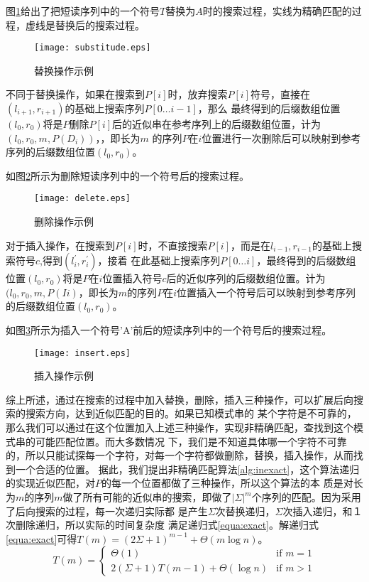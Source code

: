 图\ref{fig:substitude}给出了把短读序列中的一个符号$T$替换为$A$时的搜索过程，实线为精确匹配的过程，虚线是替换后的搜索过程。

\begin{figure}[htbp]
    \centering
    \texttt{[image: substitude.eps]}
    \caption{替换操作示例} \label{fig:substitude}
\end{figure}

不同于替换操作，如果在搜索到$P[i]$时，放弃搜索$P[i]$符号，直接在$(l_{i+1},r_{i+1})$的基础上搜索序列$P[0\ldots i-1]$，那么
最终得到的后缀数组位置$(l_0,r_0)$将是$P$删除$P[i]$后的近似串在参考序列上的后缀数组位置，计为$(l_0,r_0,m,P(D_i))$，，即长为$m$
的序列$P$在$i$位置进行一次删除后可以映射到参考序列的后缀数组位置$(l_0,r_0)$。

如图\ref{fig:delete}所示为删除短读序列中的一个符号后的搜索过程。

\begin{figure}[htbp]
    \centering
    \texttt{[image: delete.eps]}
    \caption{删除操作示例} \label{fig:delete}
\end{figure}

对于插入操作，在搜索到$P[i]$时，不直接搜索$P[i]$，而是在$l_{i-1},r_{i-1}$的基础上搜索符号$c$,得到$(l_{i}^{'},r_{i}^{'})$，接着
在此基础上搜索序列$P[0\ldots i]$，最终得到的后缀数组位置$(l_0,r_0)$将是$P$在$i$位置插入符号$c$后的近似序列的后缀数组位置。计为
$(l_0,r_0,m,P(Ii)$，即长为$m$的序列$P$在$i$位置插入一个符号后可以映射到参考序列的后缀数组位置$(l_0,r_0)$。

如图\ref{fig:insert}所示为插入一个符号'A'前后的短读序列中的一个符号后的搜索过程。

\begin{figure}[htbp]
    \centering
    \texttt{[image: insert.eps]}
    \caption{插入操作示例} \label{fig:insert}
\end{figure}

综上所述，通过在搜索的过程中加入替换，删除，插入三种操作，可以扩展后向搜索的搜索方向，达到近似匹配的目的。如果已知模式串的
某个字符是不可靠的，那么我们可以通过在这个位置加入上述三种操作，实现非精确匹配，查找到这个模式串的可能匹配位置。而大多数情况
下，我们是不知道具体哪一个字符不可靠的，所以只能试探每一个字符，对每一个字符都做删除，替换，插入操作，从而找到一个合适的位置。
据此，我们提出非精确匹配算法\ref{alg:inexact}，这个算法递归的实现近似匹配，对$P$的每一个位置都做了三种操作，所以这个算法的本
质是对长为$m$的序列$m$做了所有可能的近似串的搜索，即做了$|\Sigma|^m$个序列的匹配。因为采用了后向搜索的过程，每一次递归实际都
是产生$\Sigma$次替换递归，$\Sigma$次插入递归，和１次删除递归，所以实际的时间复杂度
满足递归式\ref{equa:exact}。解递归式\ref{equa:exact}可得$T(m)=(2\Sigma+1)^{m-1}+\Theta(m\log n)$。
\begin{equation}\label{equa:exact}
    T(m)=\begin{cases}\Theta(1) & \mbox{if } m=1 \\
    2(\Sigma+1)T(m-1)+\Theta(\log n) & \mbox{if } m>1\end{cases}
\end{equation}

